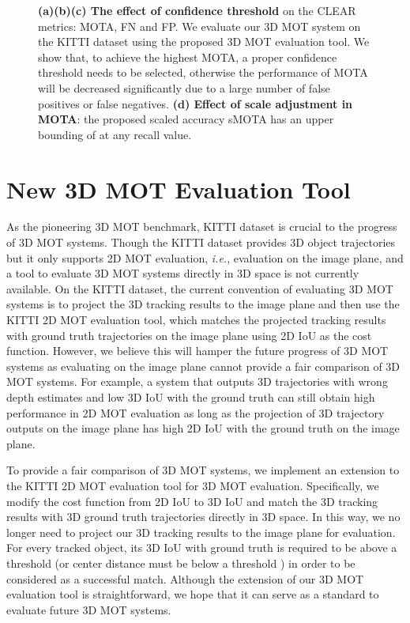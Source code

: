 \documentclass[letterpaper, 10 pt, conference]{ieeeconf}
\begin{document}
\begin{figure*}
\begin{center}
\begin{minipage}[c]{0.2455\textwidth}
\begin{center}
    \label{fig:smota_recall} 
    \end{center}
\end{minipage}
\end{center}
\vspace{-0.35cm}
\caption{\textbf{(a)(b)(c) The effect of confidence threshold} on the CLEAR metrics: MOTA, FN and FP. We evaluate our 3D MOT system on the KITTI dataset using the proposed 3D MOT evaluation tool. We show that, to achieve the highest MOTA, a proper confidence threshold needs to be selected, otherwise the performance of MOTA will be decreased significantly due to a large number of false positives or false negatives. \textbf{(d) Effect of scale adjustment in MOTA}: the proposed scaled accuracy sMOTA has an upper bounding of  at any recall value.}
\label{fig:evaluation}
\vspace{-0.5cm}
\end{figure*}



\vspace{-0.1cm}
\section{New 3D MOT Evaluation Tool}

As the pioneering 3D MOT benchmark, KITTI \cite{Geiger2012} dataset is crucial to the progress of 3D MOT systems. Though the KITTI dataset provides 3D object trajectories but it only supports 2D MOT evaluation, \emph{i.e.}, evaluation on the image plane, and a tool to evaluate 3D MOT systems directly in 3D space is not currently available. On the KITTI dataset, the current convention of evaluating 3D MOT systems is to project the 3D tracking results to the image plane and then use the KITTI 2D MOT evaluation tool, which matches the projected tracking results with ground truth trajectories on the image plane using 2D IoU as the cost function. However, we believe this will hamper the future progress of 3D MOT systems as evaluating on the image plane cannot provide a fair comparison of 3D MOT systems. For example, a system that outputs 3D trajectories with wrong depth estimates and low 3D IoU with the ground truth can still obtain high performance in 2D MOT evaluation as long as the projection of 3D trajectory outputs on the image plane has high 2D IoU with the ground truth on the image plane. 

To provide a fair comparison of 3D MOT systems, we implement an extension to the KITTI 2D MOT evaluation tool for 3D MOT evaluation. Specifically, we modify the cost function from 2D IoU to 3D IoU and match the 3D tracking results with 3D ground truth trajectories directly in 3D space. In this way, we no longer need to project our 3D tracking results to the image plane for evaluation. For every tracked object, its 3D IoU with ground truth is required to be above a threshold  (or center distance must be below a threshold ) in order to be considered as a successful match. Although the extension of our 3D MOT evaluation tool is straightforward, we hope that it can serve as a standard to evaluate future 3D MOT systems.
\end{document}
